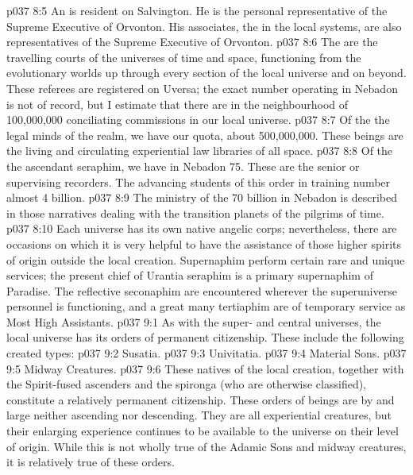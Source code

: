 \vs p037 8:5 An  is resident on Salvington. He is the personal representative of the Supreme Executive of Orvonton. His associates, the  in the local systems, are also representatives of the Supreme Executive of Orvonton.
\vs p037 8:6 The  are the travelling courts of the universes of time and space, functioning from the evolutionary worlds up through every section of the local universe and on beyond. These referees are registered on Uversa; the exact number operating in Nebadon is not of record, but I estimate that there are in the neighbourhood of 100,000,000 conciliating commissions in our local universe.
\vs p037 8:7 Of the  the legal minds of the realm, we have our quota, about 500,000,000. These beings are the living and circulating experiential law libraries of all space.
\vs p037 8:8 Of the  the ascendant seraphim, we have in Nebadon 75. These are the senior or supervising recorders. The advancing students of this order in training number almost 4 billion.
\vs p037 8:9 The ministry of the 70 billion  in Nebadon is described in those narratives dealing with the transition planets of the pilgrims of time.
\vs p037 8:10 \pc Each universe has its own native angelic corps; nevertheless, there are occasions on which it is very helpful to have the assistance of those higher spirits of origin outside the local creation. Supernaphim perform certain rare and unique services; the present chief of Urantia seraphim is a primary supernaphim of Paradise. The reflective seconaphim are encountered wherever the superuniverse personnel is functioning, and a great many tertiaphim are of temporary service as Most High Assistants.
\vs p037 9:1 As with the super\hyp{} and central universes, the local universe has its orders of permanent citizenship. These include the following created types:
\vs p037 9:2 \bibnobreakspace Susatia.
\vs p037 9:3 \bibnobreakspace Univitatia.
\vs p037 9:4 \bibnobreakspace Material Sons.
\vs p037 9:5 \bibnobreakspace Midway Creatures.
\vs p037 9:6 \pc These natives of the local creation, together with the Spirit\hyp{}fused ascenders and the spironga (who are otherwise classified), constitute a relatively permanent citizenship. These orders of beings are by and large neither ascending nor descending. They are all experiential creatures, but their enlarging experience continues to be available to the universe on their level of origin. While this is not wholly true of the Adamic Sons and midway creatures, it is relatively true of these orders.
